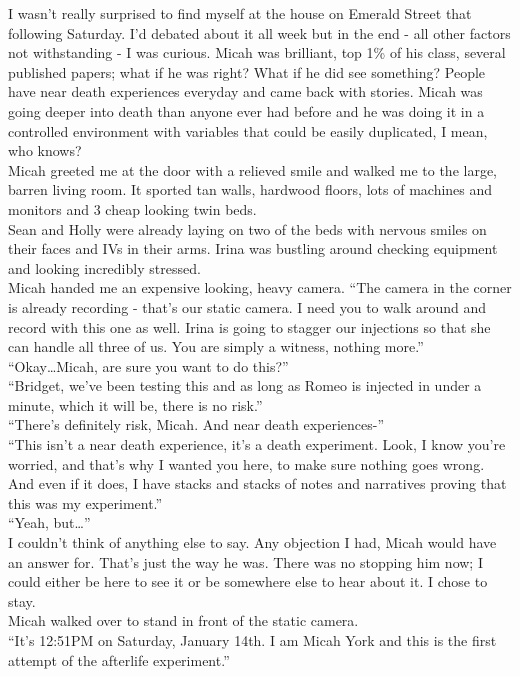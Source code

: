 \documentclass[a5paper]{scrartcl}
\begin{document}
I wasn't really surprised to find myself at the house on Emerald Street that following Saturday. I'd debated about it all week but in the end - all other factors not withstanding - I was curious. Micah was brilliant, top 1\% of his class, several published papers; what if he was right? What if he did see something? People have near death experiences everyday and came back with stories. Micah was going deeper into death than anyone ever had before and he was doing it in a controlled environment with variables that could be easily duplicated, I mean, who knows?\\
Micah greeted me at the door with a relieved smile and walked me to the large, barren living room. It sported tan walls, hardwood floors, lots of machines and monitors and 3 cheap looking twin beds.\\
Sean and Holly were already laying on two of the beds with nervous smiles on their faces and IVs in their arms. Irina was bustling around checking equipment and looking incredibly stressed.\\
Micah handed me an expensive looking, heavy camera. \enquote{The camera in the corner is already recording - that's our static camera. I need you to walk around and record with this one as well. Irina is going to stagger our injections so that she can handle all three of us. You are simply a witness, nothing more.}\\
\enquote{Okay\dots Micah, are sure you want to do this?}\\
\enquote{Bridget, we've been testing this and as long as Romeo is injected in under a minute, which it will be, there is no risk.}\\
\enquote{There’s definitely risk, Micah. And near death experiences-}\\
\enquote{This isn't a near death experience, it's a death experiment. Look, I know you’re worried, and that’s why I wanted you here, to make sure nothing goes wrong. And even if it does, I have stacks and stacks of notes and narratives proving that this was my experiment.}\\
\enquote{Yeah, but\dots}\\
I couldn't think of anything else to say. Any objection I had, Micah would have an answer for. That's just the way he was. There was no stopping him now; I could either be here to see it or be somewhere else to hear about it. I chose to stay.\\
Micah walked over to stand in front of the static camera.\\
“It’s 12:51PM on Saturday, January 14th. I am Micah York and this is the first attempt of the afterlife experiment.”\\
\end{document}
